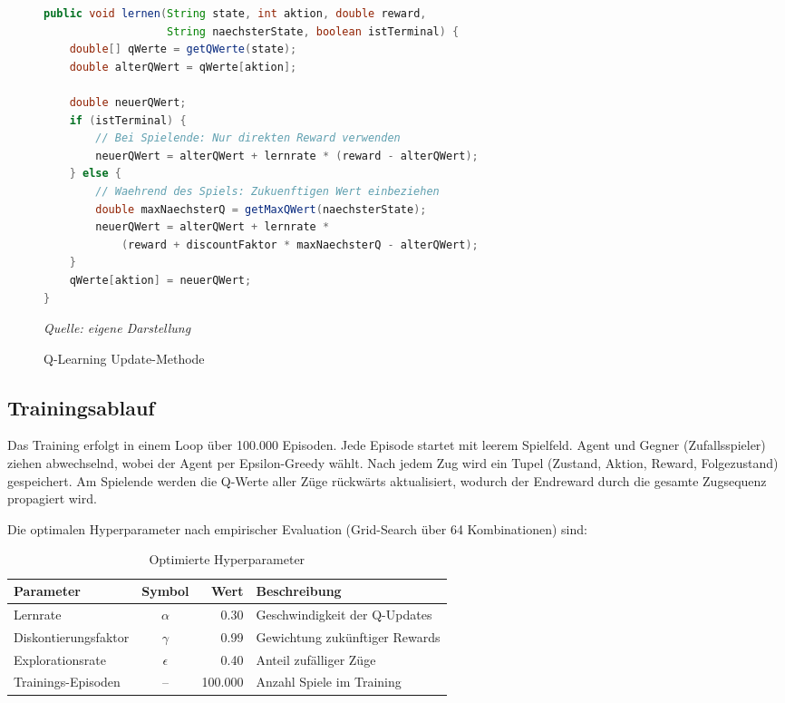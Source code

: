 \begin{figure}
    \centering
    \begin{minipage}{1\linewidth}
         \begin{lstlisting}[language=Java]
public void lernen(String state, int aktion, double reward, 
                   String naechsterState, boolean istTerminal) {
    double[] qWerte = getQWerte(state);
    double alterQWert = qWerte[aktion];
    
    double neuerQWert;
    if (istTerminal) {
        // Bei Spielende: Nur direkten Reward verwenden
        neuerQWert = alterQWert + lernrate * (reward - alterQWert);
    } else {
        // Waehrend des Spiels: Zukuenftigen Wert einbeziehen
        double maxNaechsterQ = getMaxQWert(naechsterState);
        neuerQWert = alterQWert + lernrate * 
            (reward + discountFaktor * maxNaechsterQ - alterQWert);
    }
    qWerte[aktion] = neuerQWert;
}
\end{lstlisting}
    \end{minipage}
    \caption{Q-Learning Update-Methode}
    \label{lst:q-learning-update-method}
    \centering \textit{Quelle: eigene Darstellung}
\end{figure}

\subsection{Trainingsablauf}

Das Training erfolgt in einem Loop über 100.000 Episoden. Jede Episode startet mit leerem Spielfeld. Agent und Gegner (Zufallsspieler) ziehen abwechselnd, wobei der Agent per Epsilon-Greedy wählt. Nach jedem Zug wird ein Tupel (Zustand, Aktion, Reward, Folgezustand) gespeichert. Am Spielende werden die Q-Werte aller Züge rückwärts aktualisiert, wodurch der Endreward durch die gesamte Zugsequenz propagiert wird.

Die optimalen Hyperparameter nach empirischer Evaluation (Grid-Search über 64 Kombinationen) sind:

\begin{table}[H]
\centering
\begin{tabular}{l|c|r|l}
\textbf{Parameter} & \textbf{Symbol} & \textbf{Wert} & \textbf{Beschreibung} \\
\hline
Lernrate & $\alpha$ & 0.30 & Geschwindigkeit der Q-Updates \\
Diskontierungsfaktor & $\gamma$ & 0.99 & Gewichtung zukünftiger Rewards \\
Explorationsrate & $\epsilon$ & 0.40 & Anteil zufälliger Züge \\
Trainings-Episoden & -- & 100.000 & Anzahl Spiele im Training \\
\end{tabular}
\caption{Optimierte Hyperparameter}
\end{table}


